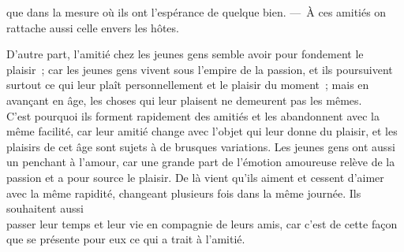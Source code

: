 \documentclass[french,twoside]{book} %
\begin{document}
que dans la mesure où ils ont l’espérance de quelque bien. — À ces amitiés on rattache aussi celle envers les hôtes.\par
D’autre part, l’amitié chez les jeunes gens semble avoir pour fondement le plaisir ; car les jeunes gens vivent sous l’empire de la passion, et ils poursuivent surtout ce qui leur plaît personnellement et le plaisir du moment ; mais en avançant en âge, les choses qui leur plaisent ne demeurent pas les mêmes. \\
C’est pourquoi ils forment rapidement des amitiés et les abandonnent avec la même facilité, car leur amitié change avec  l’objet qui leur donne du plaisir, et les plaisirs de cet âge sont sujets à de brusques variations. Les jeunes gens ont aussi un penchant à l’amour, car une grande part de l’émotion amoureuse relève de la passion et a pour source le plaisir. De là vient qu’ils aiment et cessent d’aimer avec la même rapidité, changeant plusieurs fois dans la même journée. Ils souhaitent aussi \\
passer leur temps et leur vie en compagnie de leurs amis, car c’est de cette façon que se présente pour eux ce qui a trait à l’amitié.
\end{document}
